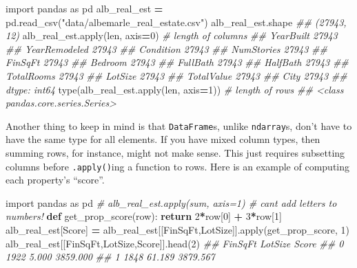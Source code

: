 \documentclass[
  12pt,
  krantz2]{krantz}
\makeatletter
\newenvironment{Shaded}{\begin{snugshade}}{\end{snugshade}}
\newcommand{\BuiltInTok}[1]{#1}
\newcommand{\CommentTok}[1]{\textcolor[rgb]{0.37,0.37,0.37}{\textit{#1}}}
\newcommand{\ControlFlowTok}[1]{\textcolor[rgb]{0.27,0.27,0.27}{\textbf{#1}}}
\newcommand{\DecValTok}[1]{\textcolor[rgb]{0.06,0.06,0.06}{#1}}
\newcommand{\ImportTok}[1]{#1}
\newcommand{\KeywordTok}[1]{\textcolor[rgb]{0.27,0.27,0.27}{\textbf{#1}}}
\newcommand{\NormalTok}[1]{#1}
\newcommand{\OperatorTok}[1]{\textcolor[rgb]{0.43,0.43,0.43}{\textbf{#1}}}
\newcommand{\StringTok}[1]{\textcolor[rgb]{0.5,0.5,0.5}{#1}}
\newenvironment{kframe}{%
\medskip{}
\setlength{\fboxsep}{.8em}
 \def\at@end@of@kframe{}%
 \ifinner\ifhmode%
  \def\at@end@of@kframe{\end{minipage}}%
  \begin{minipage}{\columnwidth}%
 \fi\fi%
 \def\FrameCommand##1{\hskip\@totalleftmargin \hskip-\fboxsep
 \colorbox{shadecolor}{##1}\hskip-\fboxsep
     \hskip-\linewidth \hskip-\@totalleftmargin \hskip\columnwidth}%
 \MakeFramed {\advance\hsize-\width
   \@totalleftmargin\z@ \linewidth\hsize
   \@setminipage}}%
 {\par\unskip\endMakeFramed%
 \at@end@of@kframe}
\renewenvironment{Shaded}{\begin{kframe}}{\end{kframe}}
\makeatother
\begin{document}
\begin{Shaded}
\begin{Highlighting}[]
\ImportTok{import}\NormalTok{ pandas }\ImportTok{as}\NormalTok{ pd}
\NormalTok{alb\_real\_est }\OperatorTok{=}\NormalTok{ pd.read\_csv(}\StringTok{"data/albemarle\_real\_estate.csv"}\NormalTok{)}
\NormalTok{alb\_real\_est.shape}
\CommentTok{\#\# (27943, 12)}
\NormalTok{alb\_real\_est.}\BuiltInTok{apply}\NormalTok{(}\BuiltInTok{len}\NormalTok{, axis}\OperatorTok{=}\DecValTok{0}\NormalTok{) }\CommentTok{\# length of columns}
\CommentTok{\#\# YearBuilt        27943}
\CommentTok{\#\# YearRemodeled    27943}
\CommentTok{\#\# Condition        27943}
\CommentTok{\#\# NumStories       27943}
\CommentTok{\#\# FinSqFt          27943}
\CommentTok{\#\# Bedroom          27943}
\CommentTok{\#\# FullBath         27943}
\CommentTok{\#\# HalfBath         27943}
\CommentTok{\#\# TotalRooms       27943}
\CommentTok{\#\# LotSize          27943}
\CommentTok{\#\# TotalValue       27943}
\CommentTok{\#\# City             27943}
\CommentTok{\#\# dtype: int64}
\BuiltInTok{type}\NormalTok{(alb\_real\_est.}\BuiltInTok{apply}\NormalTok{(}\BuiltInTok{len}\NormalTok{, axis}\OperatorTok{=}\DecValTok{1}\NormalTok{)) }\CommentTok{\# length of rows}
\CommentTok{\#\# \textless{}class \textquotesingle{}pandas.core.series.Series\textquotesingle{}\textgreater{}}
\end{Highlighting}
\end{Shaded}

Another thing to keep in mind is that \texttt{DataFrame}s, unlike \texttt{ndarray}s, don't have to have the same type for all elements. If you have mixed column types, then summing rows, for instance, might not make sense. This just requires subsetting columns before \texttt{.apply()}ing a function to rows. Here is an example of computing each property's ``score''.

\begin{Shaded}
\begin{Highlighting}[]
\ImportTok{import}\NormalTok{ pandas }\ImportTok{as}\NormalTok{ pd}
\CommentTok{\# alb\_real\_est.apply(sum, axis=1) \# can\textquotesingle{}t add letters to numbers!}
\KeywordTok{def}\NormalTok{ get\_prop\_score(row):}
  \ControlFlowTok{return} \DecValTok{2}\OperatorTok{*}\NormalTok{row[}\DecValTok{0}\NormalTok{] }\OperatorTok{+} \DecValTok{3}\OperatorTok{*}\NormalTok{row[}\DecValTok{1}\NormalTok{]}
\NormalTok{alb\_real\_est[}\StringTok{\textquotesingle{}Score\textquotesingle{}}\NormalTok{] }\OperatorTok{=}\NormalTok{ alb\_real\_est[[}\StringTok{\textquotesingle{}FinSqFt\textquotesingle{}}\NormalTok{,}\StringTok{\textquotesingle{}LotSize\textquotesingle{}}\NormalTok{]].}\BuiltInTok{apply}\NormalTok{(get\_prop\_score, }\DecValTok{1}\NormalTok{)}
\NormalTok{alb\_real\_est[[}\StringTok{\textquotesingle{}FinSqFt\textquotesingle{}}\NormalTok{,}\StringTok{\textquotesingle{}LotSize\textquotesingle{}}\NormalTok{,}\StringTok{\textquotesingle{}Score\textquotesingle{}}\NormalTok{]].head(}\DecValTok{2}\NormalTok{)}
\CommentTok{\#\#    FinSqFt  LotSize     Score}
\CommentTok{\#\# 0     1922    5.000  3859.000}
\CommentTok{\#\# 1     1848   61.189  3879.567}
\end{Highlighting}
\end{Shaded}
\end{document}
